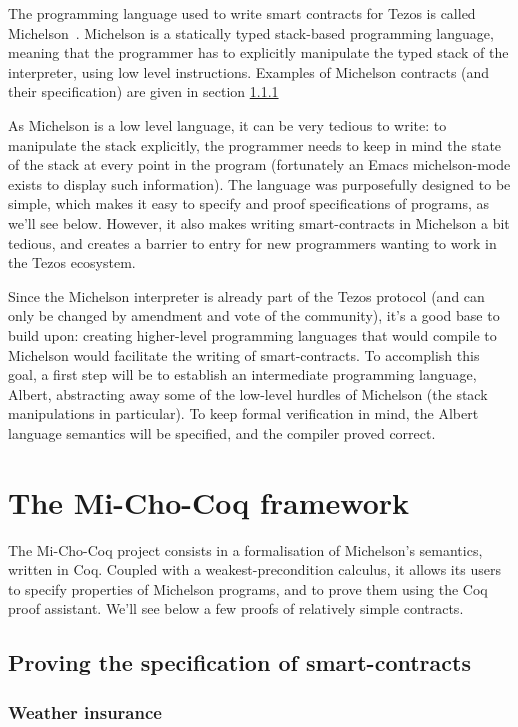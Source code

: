 \documentclass{report}
\begin{document}
The programming language used to write smart contracts for Tezos is called Michelson~\cite{michelsonwhitedoc}. Michelson is a statically typed stack-based programming language, meaning that the programmer has to explicitly manipulate the typed stack of the interpreter, using low level instructions. Examples of Michelson contracts (and their specification) are given in section \ref{contractsSpec}

As Michelson is a low level language, it can be very tedious to write: to manipulate the stack explicitly, the programmer needs to keep in mind the state of the stack at every point in the program (fortunately an Emacs michelson-mode exists to display such information). The language was purposefully designed to be simple, which makes it easy to specify and proof specifications of programs, as we'll see below. However, it also makes writing smart-contracts in Michelson a bit tedious, and creates a barrier to entry for new programmers wanting to work in the Tezos ecosystem.

Since the Michelson interpreter is already part of the Tezos protocol (and can only be changed by amendment and vote of the community), it's a good base to build upon: creating higher-level programming languages that would compile to Michelson would facilitate the writing of smart-contracts. To accomplish this goal, a first step will be to establish an intermediate programming language, Albert, abstracting away some of the low-level hurdles of Michelson (the stack manipulations in particular). To keep formal verification in mind, the Albert language semantics will be specified, and the compiler proved correct.

\chapter{The Mi-Cho-Coq framework}

The Mi-Cho-Coq project consists in a formalisation of Michelson's semantics, written in Coq. Coupled with a weakest-precondition calculus, it allows its users to specify properties of Michelson programs, and to prove them using the Coq proof assistant. We'll see below a few proofs of relatively simple contracts.

\section{Proving the specification of smart-contracts}

\subsection{Weather insurance}
\label{contractsSpec}
\end{document}
